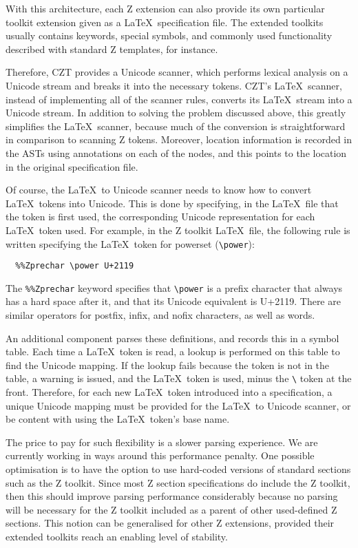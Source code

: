 \documentclass{llncs}
\begin{document}
With this architecture, each Z extension can also provide its own
particular toolkit extension given as a \LaTeX\ specification file.
The extended toolkits usually contains keywords, special symbols,
and commonly used functionality described with standard Z templates, for instance.

Therefore, CZT provides a Unicode scanner, which performs lexical
analysis on a Unicode stream and breaks it into the necessary
tokens. CZT's \LaTeX~scanner, instead of implementing all of the
scanner rules, converts its \LaTeX~stream into a Unicode stream. In
addition to solving the problem discussed above, this greatly
simplifies the \LaTeX~scanner, because much of the conversion is
straightforward in comparison to scanning Z tokens. Moreover, location
information is recorded in the ASTs using annotations on each of the
nodes, and this points to the location in the original specification file.

Of course, the \LaTeX~to Unicode scanner needs to know how to convert
\LaTeX~tokens into Unicode. This is done by specifying, in the \LaTeX\
file that the token is first used, the corresponding Unicode
representation for each \LaTeX~token used. For example, in the Z
toolkit \LaTeX~file, the following rule is written specifying the
\LaTeX\ token for powerset (\verb+\power+):
\begin{verbatim}
  %%Zprechar \power U+2119
\end{verbatim}
%
The {\tt \%\%Zprechar} keyword specifies that \verb+\power+ is a
prefix character that always has a hard space after it, and that its
Unicode equivalent is U+2119. There are
similar operators for postfix, infix, and nofix characters, as well as
words.

An additional component parses these definitions, and records this in
a symbol table. Each time a \LaTeX~token is read, a lookup is
performed on this table to find the Unicode mapping. If the lookup
fails because the token is not in the table, a warning is issued, and
the \LaTeX~token is used, minus the \verb+\+ token at the
front. Therefore, for each new \LaTeX~token introduced into a
specification, a unique Unicode mapping must be provided for the
\LaTeX~to Unicode scanner, or be content with using the \LaTeX~token's
base name.

The price to pay for such flexibility is a slower parsing experience.
We are currently working in ways around this performance penalty.  One
possible optimisation is to have the option to use hard-coded versions
of standard sections such as the Z toolkit.  Since most Z section
specifications do include the Z toolkit, then this should improve
parsing performance considerably because no parsing will be necessary
for the Z toolkit included as a parent of other used-defined Z
sections.  This notion can be generalised for other Z extensions,
provided their extended toolkits reach an enabling level of stability.
\end{document}
